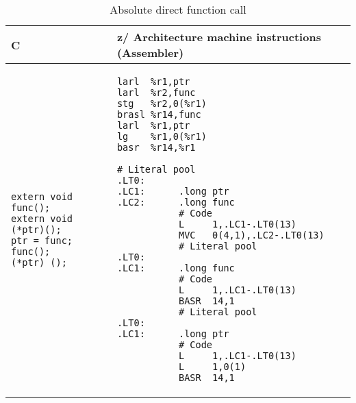 \documentclass[english,11pt,twoside,toc=bib,toc=idx]{scrreprt}
\newcommand{\ARCH}{z/\kern-1pt Ar\-chi\-tec\-ture}
\newcommand{\ARCH}{ESA/390}
\newenvironment{DIFnomarkup}{}{} %
\begin{document}
\begin{table}
  \centering
  \begin{DIFnomarkup}
  \begin{tabular}{p{}p{}}
    \toprule
    C & \ARCH{} machine instructions (Assembler) \\
    \midrule
\begin{lstlisting}[style=short]
extern void func();
extern void (*ptr)();
ptr = func;
func();
(*ptr) ();
\end{lstlisting}
    &
\ifzseries
\begin{lstlisting}[style=short,language=simpleasm]
larl  %r1,ptr
larl  %r2,func
stg   %r2,0(%r1)
brasl %r14,func
larl  %r1,ptr
lg    %r1,0(%r1)
basr  %r14,%r1
\end{lstlisting}
\else
\begin{lstlisting}[style=short,language=simpleasm]
           # Literal pool
.LT0:
.LC1:      .long ptr
.LC2:      .long func
           # Code
           L     1,.LC1-.LT0(13)
           MVC   0(4,1),.LC2-.LT0(13)
           # Literal pool
.LT0:
.LC1:      .long func
           # Code
           L     1,.LC1-.LT0(13)
           BASR  14,1
           # Literal pool
.LT0:
.LC1:      .long ptr
           # Code
           L     1,.LC1-.LT0(13)
           L     1,0(1)
           BASR  14,1
\end{lstlisting}
\fi \\
    \bottomrule
  \end{tabular}
  \end{DIFnomarkup}
  \caption{Absolute {\ifzseries\else direct\fi} function call}
  \label{tab:fncalldirect}
\end{table}
\end{document}

